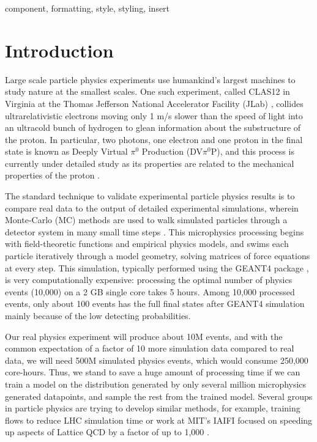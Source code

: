 \documentclass[conference]{IEEEtran}
\begin{document}
\begin{IEEEkeywords}
component, formatting, style, styling, insert
\end{IEEEkeywords}

\section{Introduction}
Large scale particle physics experiments use humankind's largest machines to study nature at the smallest scales. One such experiment, called CLAS12 in Virginia at the Thomas Jefferson National Accelerator Facility (JLab) \cite{BURKERT2020163419}, collides ultrarelativistic electrons moving only 1 m/s slower than the speed of light into an ultracold bunch of hydrogen to glean information about the substructure of the proton. In particular, two photons, one electron and one proton in the final state is known as Deeply Virtual $\pi^0$ Production (DV$\pi^0$P), and this process is currently under detailed study as its properties are related to the mechanical properties of the proton \cite{PhysRevD.55.7114}.

The standard technique to validate experimental particle physics results is to compare real data to the output of detailed experimental simulations, wherein Monte-Carlo (MC) methods are used to walk simulated particles through a detector system in many small time steps \cite{PhysRevLett.115.212003, 10.1093/ptep/ptaa104}. This microphysics processing begins with field-theoretic functions and empirical physics models, and swims each particle iteratively through a model geometry, solving matrices of force equations at every step. This simulation, typically performed using the GEANT4 package \cite{AGOSTINELLI2003250}, is very computationally expensive: processing the optimal number of physics events (10,000) on a 2 GB single core takes 5 hours. Among 10,000 processed events, only about 100 events has the full final states after GEANT4 simulation mainly because of the low detecting probabilities.

Our real physics experiment will produce about 10M events, and with the common expectation of a factor of 10 more simulation data compared to real data, we will need 500M simulated physics events, which would consume 250,000 core-hours. Thus, we stand to save a huge amount of processing time if we can train a model on the distribution generated by only several million microphysics generated datapoints, and sample the rest from the trained model. Several groups in particle physics are trying to develop similar methods, for example, training flows to reduce LHC simulation time \cite{stan} or work at MIT's IAIFI focused on speeding up aspects of Lattice QCD by a factor of up to 1,000 \cite{phialia}.
\end{document}
